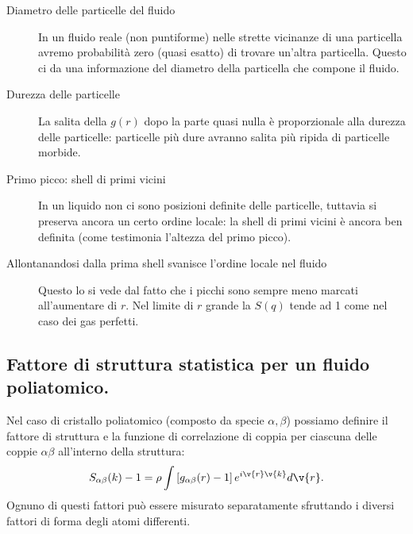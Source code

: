 \begin{description}
	\item[Diametro delle particelle del fluido] 
		In un fluido reale (non puntiforme) nelle strette vicinanze di una 
		particella avremo probabilità zero (quasi esatto) di trovare un'altra
		particella. Questo ci da una informazione del diametro della particella
		che compone il fluido.
	\item[Durezza delle particelle]
		La salita della $g(r)$ dopo la parte quasi nulla è proporzionale alla
		durezza delle particelle: particelle più dure avranno salita più ripida
		di particelle morbide.
	\item[Primo picco: shell di primi vicini]
		In un liquido non ci sono posizioni definite delle particelle, tuttavia 
		si preserva ancora un certo ordine locale: la shell di primi vicini è
		ancora ben definita (come testimonia l'altezza del primo picco).
	\item[Allontanandosi dalla prima shell svanisce l'ordine locale nel fluido]
		Questo lo si vede dal fatto che i picchi sono sempre meno marcati 
		all'aumentare di $r$. Nel limite di $r$ grande la $S(q)$ tende
		ad 1 come nel caso dei gas perfetti.
\end{description}
\subsection{Fattore di struttura statistica per un fluido poliatomico.}
\label{subsec:Fattore di struttura statistica per un cristallo poliatomica}
Nel caso di cristallo poliatomico (composto da specie $\alpha,\beta$) possiamo definire il fattore di struttura e la funzione di correlazione di coppia per ciascuna delle coppie $\alpha\beta$ all'interno della struttura:
\[
	S_{\alpha\beta}(k) - 1 =
	\rho \int\left[ g_{\alpha\beta}(r)-1 \right]e^{i \v{r}\v{k}}d \v{r}
.\] 
Ognuno di questi fattori può essere misurato separatamente sfruttando i diversi fattori di forma degli atomi differenti.
